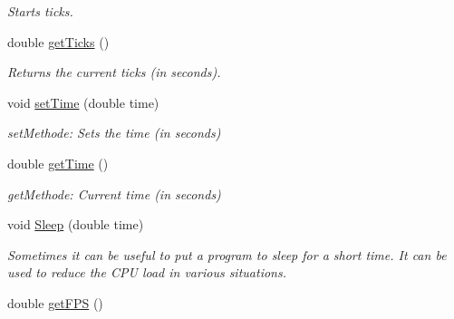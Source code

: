 \begin{DoxyCompactItemize}
\begin{DoxyCompactList}\small\item\em Starts ticks. \item\end{DoxyCompactList}\item 
\hypertarget{class_f2_c_1_1_window_a40e7bde6336371496cf95cac06fb02c6}{
double \hyperlink{class_f2_c_1_1_window_a40e7bde6336371496cf95cac06fb02c6}{getTicks} ()}
\label{class_f2_c_1_1_window_a40e7bde6336371496cf95cac06fb02c6}

\begin{DoxyCompactList}\small\item\em Returns the current ticks (in seconds). \item\end{DoxyCompactList}\item 
\hypertarget{class_f2_c_1_1_window_a1ea7f6ad0371c7b7a40196c3e16fff55}{
void \hyperlink{class_f2_c_1_1_window_a1ea7f6ad0371c7b7a40196c3e16fff55}{setTime} (double time)}
\label{class_f2_c_1_1_window_a1ea7f6ad0371c7b7a40196c3e16fff55}

\begin{DoxyCompactList}\small\item\em setMethode: Sets the time (in seconds) \item\end{DoxyCompactList}\item 
\hypertarget{class_f2_c_1_1_window_afcc4b6bc63531041421463538f1af179}{
double \hyperlink{class_f2_c_1_1_window_afcc4b6bc63531041421463538f1af179}{getTime} ()}
\label{class_f2_c_1_1_window_afcc4b6bc63531041421463538f1af179}

\begin{DoxyCompactList}\small\item\em getMethode: Current time (in seconds) \item\end{DoxyCompactList}\item 
void \hyperlink{class_f2_c_1_1_window_a1ee9014047dc994e2b32de4910ad6c49}{Sleep} (double time)
\begin{DoxyCompactList}\small\item\em Sometimes it can be useful to put a program to sleep for a short time. It can be used to reduce the CPU load in various situations. \item\end{DoxyCompactList}\item 
\hypertarget{class_f2_c_1_1_window_aa6fe96cb49214cf71e822d7d7493e648}{
double \hyperlink{class_f2_c_1_1_window_aa6fe96cb49214cf71e822d7d7493e648}{getFPS} ()}
\label{class_f2_c_1_1_window_aa6fe96cb49214cf71e822d7d7493e648}


\end{DoxyCompactItemize}
